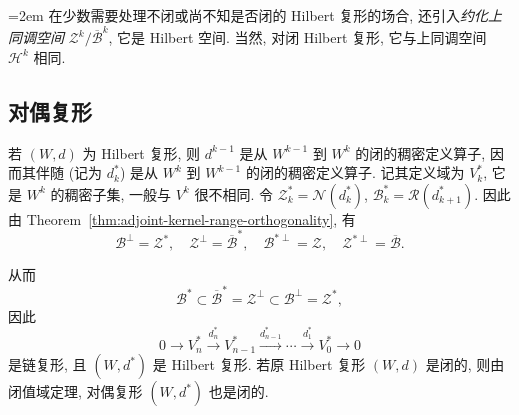 {\emergencystretch=2em
{在少数需要处理不闭或尚不知是否闭的 Hilbert 复形的场合, 还引入\emph{约化上同调空间} $\mathcal Z^k/\overline{\mathcal B}^k$, 它是 Hilbert 空间. 当然, 对闭 Hilbert 复形, 它与上同调空间 $\mathcal H^k$ 相同.}

\par}
\subsection{{对偶复形}}\label{subsec:dual-hilbert-complex}

{若 $(W,d)$ 为 Hilbert 复形, 则 $d^{k-1}$ 是从 $W^{k-1}$ 到 $W^k$ 的闭的稠密定义算子, 因而其伴随 (记为 $d_k^*$) 是从 $W^k$ 到 $W^{k-1}$ 的闭的稠密定义算子. 记其定义域为 $V_k^*$, 它是 $W^k$ 的稠密子集, 一般与 $V^k$ 很不相同. 令 $\mathcal Z_k^*=\mathcal N(d_k^*)$, $\mathcal B_k^*=\mathcal R(d_{k+1}^*)$. 因此由 Theorem~\ref{thm:adjoint-kernel-range-orthogonality}, 有}
\[
\mathcal B^\perp=\mathcal Z^*,\quad\mathcal Z^\perp=\overline{\mathcal B}^*,\quad\mathcal B^{*\perp}=\mathcal Z,\quad\mathcal Z^{*\perp}=\overline{\mathcal B}.
\]

{从而}
\[
\mathcal B^*\subset\overline{\mathcal B}^*=\mathcal Z^\perp\subset\mathcal B^\perp=\mathcal Z^*,
\]
{因此}
\[
0\to V_n^*\xrightarrow{d_n^*}V_{n-1}^*\xrightarrow{d_{n-1}^*}\cdots\xrightarrow{d_1^*}V_0^*\to0
\]
{是链复形, 且 $(W,d^*)$ 是 Hilbert 复形. 若原 Hilbert 复形 $(W,d)$ 是闭的, 则由闭值域定理, 对偶复形 $(W,d^*)$ 也是闭的.}
